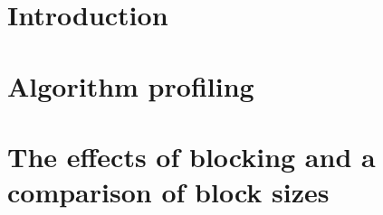 \section{Introduction}
\label{software:Introduction}


\section{Algorithm profiling}
\label{software:algorithmProfiling}


\section{The effects of blocking and a comparison of block sizes}
\label{software:blockSize}

